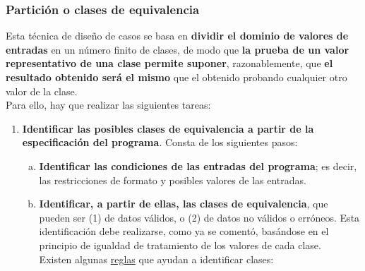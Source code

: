 \subsubsection{Partición o clases de equivalencia}

Esta técnica de diseño de casos se basa en \textbf{dividir el dominio de valores de entradas} en un número finito de clases, de modo que \textbf{la prueba de un valor representativo de una clase permite suponer}, razonablemente, que \textbf{el resultado obtenido será el mismo} que el obtenido probando cualquier otro valor de la clase.\\

Para ello, hay que realizar las siguientes tareas:

\begin{enumerate}
    \item \textbf{Identificar las posibles clases de equivalencia a partir de la especificación del programa}. Consta de los siguientes pasos:
    
    \begin{enumerate}[a.]
        \item \textbf{Identificar las condiciones de las entradas del programa}; es decir, las restricciones de formato y posibles valores de las entradas.
        
        \item \textbf{Identificar, a partir de ellas, las clases de equivalencia}, que pueden ser (1) de datos válidos, o (2) de datos no válidos o erróneos. Esta identificación debe realizarse, como ya se comentó, basándose en el principio de igualdad de tratamiento de los valores de cada clase.\\
        
        Existen algunas \uline{reglas} que ayudan a identificar clases:


\end{enumerate}
\end{enumerate}
